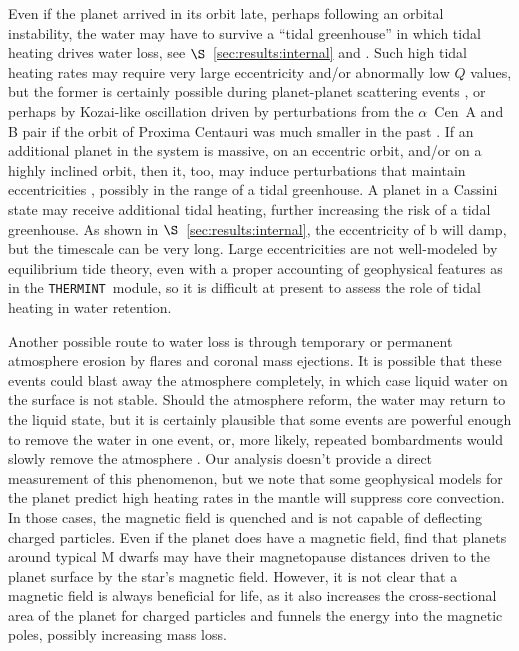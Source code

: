 \documentclass[preprint,12pt]{aastex}
\def\acen{{$\alpha$~Cen}}
\def\thermint{\texttt{\footnotesize{THERMINT}}\xspace}
\begin{document}
Even if the planet arrived in its orbit late, perhaps following an
orbital instability, the water may have to survive a ``tidal
greenhouse'' in which tidal heating drives water loss, see
$\S$~\ref{sec:results:internal} and \cite{Barnes13}. Such high tidal
heating rates may require very large eccentricity and/or abnormally
low $Q$ values, but the former is certainly possible during
planet-planet scattering events \citep{Chatterjee08}, or perhaps by
Kozai-like oscillation driven by perturbations from the \acen~A and B
pair if the orbit of Proxima Centauri was much smaller in the past
\citep{DesideraBarbieri07}. If an additional planet in the system is
massive, on an eccentric orbit, and/or on a highly inclined orbit,
then it, too, may induce perturbations that maintain eccentricities
\citep{TakedaRasio05}, possibly in the range of a tidal greenhouse. A
planet in a Cassini state may receive additional tidal heating,
further increasing the risk of a tidal greenhouse. As shown in
$\S$~\ref{sec:results:internal}, the eccentricity of b will damp, but
the timescale can be very long. Large eccentricities are not
well-modeled by equilibrium tide theory, even with a proper accounting
of geophysical features as in the \thermint~module, so it is difficult
at present to assess the role of tidal heating in water retention.

Another possible route to water loss is through temporary or permanent
atmosphere erosion by flares and coronal mass ejections. It is
possible that these events could blast away the atmosphere completely,
in which case liquid water on the surface is not stable. Should the
atmosphere reform, the water may return to the liquid state, but it is
certainly plausible that some events are powerful enough to remove the
water in one event, or, more likely, repeated bombardments would
slowly remove the atmosphere \citep{Cohen15}.  Our analysis doesn't
provide a direct measurement of this phenomenon, but we note that some
geophysical models for the planet predict high heating rates in the
mantle will suppress core convection. In those cases, the magnetic
field is quenched and is not capable of deflecting charged
particles. Even if the planet does have a magnetic field,
\cite{Vidotto13} find that planets around typical M dwarfs may have
their magnetopause distances driven to the planet surface by the
star's magnetic field. However, it is not clear that a magnetic field
is always beneficial for life, as it also increases the
cross-sectional area of the planet for charged particles and funnels
the energy into the magnetic poles, possibly increasing mass loss.
\end{document}

